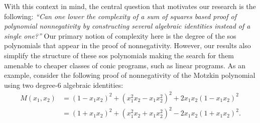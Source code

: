 \documentclass[12pt]{article}
\theoremstyle{remark}
\begin{document}
With this context in mind, the central question that motivates our research is the following: \emph{``Can one lower the complexity of a sum of squares based proof of polynomial nonnegativity by constructing several algebraic identities instead of a single one?''} Our primary notion of complexity here is the degree of the sos polynomials that appear in the proof of nonnegativity. However, our results also simplify the structure of these sos polynomials making the search for them amenable to cheaper classes of conic programs, such as linear programs. As an example, consider the following proof of nonnegativity of the Motzkin polynomial using two degree-6 algebraic identities:
\begin{equation}\label{eq:Motzkin.disos.proof}
\begin{aligned}
M(x_1,x_2) &= (1-x_1x_2)^2 + (x_1^2x_2-x_1x_2^2)^2 + 2x_1x_2(1-x_1x_2)^2\\
    & = (1+x_1x_2)^2 + (x_1^2x_2+x_1x_2^2)^2 - 2x_1x_2(1+x_1x_2)^2. 
    \end{aligned}    
\end{equation}
\end{document}
